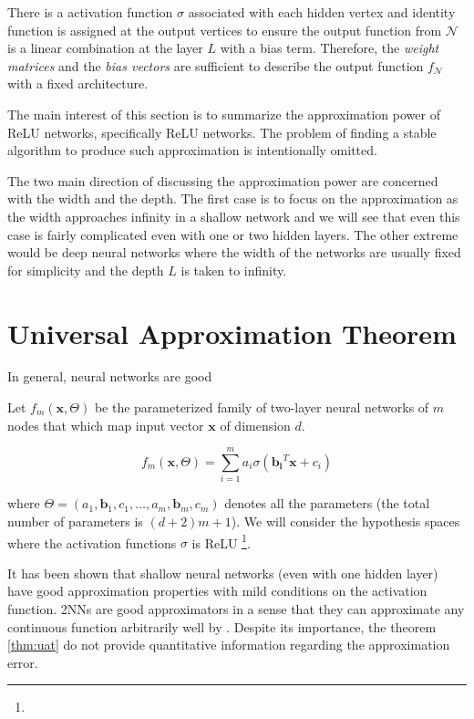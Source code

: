 There is a activation function $\sigma$ associated with each hidden vertex and
identity function is assigned at the output vertices to ensure the output
function from $\mathcal{N}$ is a linear combination at the layer $L$ with a bias
term. Therefore, the \textit{weight matrices} and the \textit{bias vectors} are
sufficient to describe the output function $f_{\mathcal{N}}$ with a fixed
architecture.

The main interest of this section is to summarize the approximation power of
ReLU networks, specifically ReLU networks. The problem of finding a stable
algorithm to produce such approximation is intentionally omitted.

The two main direction of discussing the approximation power are concerned with
the width and the depth. The first case is to focus on the approximation as the
width approaches infinity in a shallow network and we will see that even this
case is fairly complicated even with one or two hidden layers. The other extreme
would be deep neural networks where the width of the networks are usually fixed
for simplicity and the depth $L$ is taken to infinity. 

\section{Universal Approximation Theorem}
\label{sec:uat}

In general, neural networks are good 


Let $f_m(\mathbf{x}, \Theta)$ be the parameterized family of two-layer neural
networks of $m$ nodes that which map input vector $\mathbf{x}$ of dimension $d$.

\begin{equation}
    f_m(\mathbf{x}, \Theta) = \sum_{i=1}^m a_i \sigma(\mathbf{b_i}^T\mathbf{x} + c_i)
\end{equation}

where $\Theta = (a_1, \mathbf{b}_1, c_1, \dots, a_m, \mathbf{b}_m, c_m)$ denotes
all the parameters (the total number of parameters is $(d+2)m + 1$). We will
consider the hypothesis spaces where the activation functions $\sigma$ is ReLU
\footnote{}.


It has been shown that shallow neural networks (even with one hidden layer) have
good approximation properties with mild conditions on the activation function.
2NNs are good approximators in a sense that they can approximate any continuous
function arbitrarily well by
\cite{cybenkoApproximationSuperpositionsSigmoidal1989}. Despite its importance,
the theorem \ref{thm:uat} do not provide quantitative information regarding the
approximation error.

